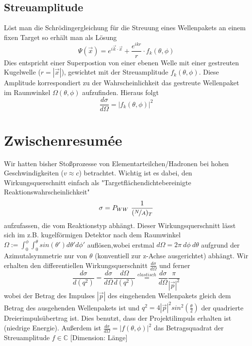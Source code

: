 \documentclass[Ex4_Zusammenfassung.tex]{subfiles}
\begin{document}
\subsection{Streuamplitude}
Löst man die Schrödingergleichung für die Streuung eines Wellenpakets an einem fixen Target so erhält man als Lösung
\begin{equation}
\Psi(\vec x) = e^{i \vec k \cdot \vec x} + \frac{e^{ikr}}{r} \cdot f_k(\theta,\phi)
\end{equation}
Dies entspricht einer Superpostion von einer ebenen Welle mit einer gestreuten Kugelwelle ($r=|\vec x|$), gewichtet mit der Streuamplitude $f_k(\theta,\phi)$. Diese Amplitude korrespondiert zu der Wahrscheinlichkeit das gestreute Wellenpaket im Raumwinkel $\Omega(\theta,\phi)$ aufzufinden. Hieraus folgt
\begin{equation}
\frac{d\sigma}{d\Omega} = |f_k(\theta,\phi)|^2
\end{equation}

\section{Zwischenresumée}
Wir hatten bisher Stoßprozesse von Elementarteilchen/Hadronen bei hohen Geschwindigkeiten ($v \approx c$) betrachtet. Wichtig ist es dabei, den Wirkungsquerschnitt einfach als "Targetflächendichtebereinigte Reaktionswahrscheinlichkeit"
\begin{equation} 
\sigma = P_{WW} \  \frac{1}{(\nicefrac{N}{A})_T}
\end{equation}
 aufzufassen, die vom Reaktionstyp abhängt. Dieser Wirkungsquerschnitt lässt sich im z.B. kugelförmigen Detektor nach dem Raumwinkel $\Omega := \int_0^{\phi} \int_0^{\theta} sin(\theta') d\theta' d\phi'$ auflösen,wobei erstmal $d\Omega = 2\pi \ d\phi \ d\theta$ aufgrund der Azimutalsymmetrie nur von $\theta$ (konventiell zur z-Achse ausgerichtet) abhängt. Wir erhalten den differentiellen Wirkungsquerschnitt $\frac{d\sigma}{d\Omega}$ und ferner
\begin{equation}
\frac{d\sigma}{d(q^2)} = \frac{d\sigma}{d\Omega} \frac{d\Omega}{d(q^2)} \stackrel{elastisch}{=}  \frac{d\sigma}{d\Omega} \frac{\pi}{|\vec p|^2}
\end{equation}
wobei der Betrag des Impulses  $|\vec p|$ des eingehenden Wellenpakets gleich dem Betrag des ausgehenden Wellenpakets ist und $q^2 = 4 |\vec p|^2 sin^2(\frac{\theta}{2}) $ der quadrierte Dreierimpulsübertrag ist. \newline
Dies benutzt, dass der Projektilimpuls erhalten ist (niedrige Energie). Außerdem ist $\frac{d\sigma}{d\Omega} = |f(\theta,\phi)|^2$ das Betragsquadrat der Streuamplitude $f \in \mathbb{C}$ [Dimension: Länge]
\end{document}
